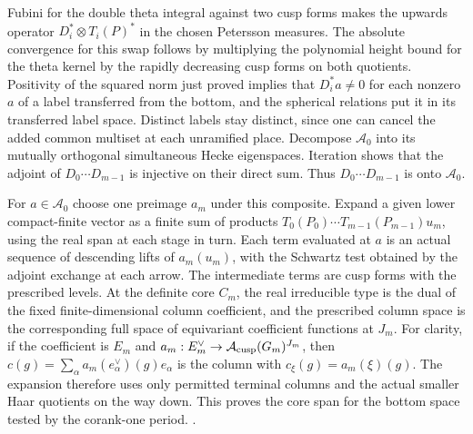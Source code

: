 Fubini for the double theta integral against two cusp forms
makes the upwards operator \(D_i^*\otimes T_i(P)^*\) in the
chosen Petersson measures. The absolute convergence for this
swap follows by multiplying the polynomial height bound for the
theta kernel by the rapidly decreasing cusp forms on both
quotients. Positivity of the squared norm just proved implies that
\(D_i^*a\ne0\) for each nonzero \(a\) of a label transferred
from the bottom, and the spherical relations put it in its
transferred label space. Distinct labels stay distinct, since one
can cancel the added common multiset at each unramified place.
Decompose \(\mathcal A_0\) into its mutually orthogonal simultaneous
Hecke eigenspaces. Iteration shows that the adjoint of
\(D_0\cdots D_{m-1}\) is injective on their direct sum.
Thus \(D_0\cdots D_{m-1}\) is onto \(\mathcal A_0\).

For \(a\in\mathcal A_0\) choose one preimage \(a_m\) under
this composite. Expand a given lower compact-finite vector as a
finite sum of products \(T_0(P_0)\cdots T_{m-1}(P_{m-1})u_m\),
using the real span at each stage in turn. Each term evaluated
at \(a\) is an actual sequence of descending lifts of
\(a_m(u_m)\), with the Schwartz test obtained by the adjoint
exchange at each arrow. The intermediate terms are cusp forms
with the prescribed levels. At the definite core \(C_m\), the
real irreducible type is the dual of the fixed
finite-dimensional column coefficient, and the prescribed column
space is the corresponding full space of equivariant coefficient
functions at \(J_m\). For clarity, if the coefficient is \(E_m\)
and \(a_m:E_m^\vee\to\mathcal A_{\rm cusp}(G_m)^{J_m}\), then
\(c(g)=\sum_\alpha a_m(e_\alpha^\vee)(g)e_\alpha\) is the
column with \(c_\xi(g)=a_m(\xi)(g)\).
The expansion therefore uses only permitted terminal columns and
the actual smaller Haar quotients on the way down. This proves the
core span for the bottom space tested by the corank-one period.
.

